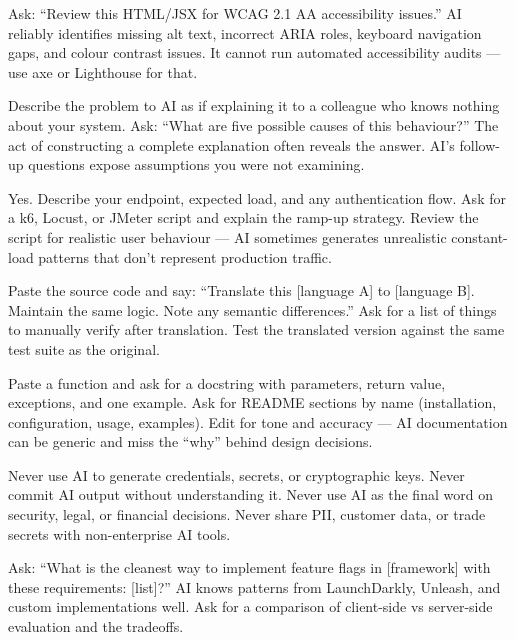 {Ask: ``Review this HTML/JSX for WCAG 2.1 AA accessibility issues.''
AI reliably identifies missing alt text, incorrect ARIA roles, keyboard navigation
gaps, and colour contrast issues.
It cannot run automated accessibility audits --- use axe or Lighthouse for that.}

{Describe the problem to AI as if explaining it to a colleague who knows nothing
about your system.
Ask: ``What are five possible causes of this behaviour?''
The act of constructing a complete explanation often reveals the answer.
AI's follow-up questions expose assumptions you were not examining.}

{Yes.
Describe your endpoint, expected load, and any authentication flow.
Ask for a k6, Locust, or JMeter script and explain the ramp-up strategy.
Review the script for realistic user behaviour --- AI sometimes generates unrealistic
constant-load patterns that don't represent production traffic.}

{Paste the source code and say: ``Translate this [language A] to [language B].
Maintain the same logic. Note any semantic differences.''
Ask for a list of things to manually verify after translation.
Test the translated version against the same test suite as the original.}

{Paste a function and ask for a docstring with parameters, return value, exceptions,
and one example.
Ask for README sections by name (installation, configuration, usage, examples).
Edit for tone and accuracy --- AI documentation can be generic and miss the
``why'' behind design decisions.}

{Never use AI to generate credentials, secrets, or cryptographic keys.
Never commit AI output without understanding it.
Never use AI as the final word on security, legal, or financial decisions.
Never share PII, customer data, or trade secrets with non-enterprise AI tools.}

{Ask: ``What is the cleanest way to implement feature flags in [framework] with these
requirements: [list]?''
AI knows patterns from LaunchDarkly, Unleash, and custom implementations well.
Ask for a comparison of client-side vs server-side evaluation and the tradeoffs.}

